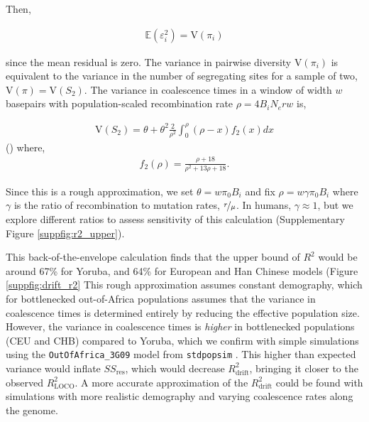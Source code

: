 \documentclass[11pt]{article}
\newcommand{\E}{\mathbb{E}}
\newcommand{\V}{\text{V}}
\begin{document}
Then, 

\begin{align}
    \E(\varepsilon_i^2) = \V(\pi_i)
\end{align}

since the mean residual is zero. The variance in pairwise diversity
$\V(\pi_i)$ is equivalent to the variance in the number of segregating sites
for a sample of two, $\V(\pi) = \V(S_2)$. The variance in coalescence times
in a window of width $w$ basepairs with population-scaled recombination rate
$\rho = 4 B_i N_e r w$ is,

\begin{align}
    \V(S_2) = \theta + \theta^2 \frac{2}{\rho^2} \int_0^\rho (\rho - x) f_2(x) dx
\end{align}
(\cite[eq. 7.20]{Wakeley2009-ua}) where,
\begin{align}
    f_2(\rho) = \frac{\rho + 18}{\rho^2 + 13 \rho + 18}.
\end{align}

Since this is a rough approximation,  we set $\theta = w \pi_0 B_i$ and fix
$\rho = w \gamma \pi_0 B_i$ where $\gamma$ is the ratio of recombination to
mutation rates, $\nicefrac{r}{\mu}$. In humans, $\gamma \approx 1$, but we
explore different ratios to assess sensitivity of this calculation
(Supplementary Figure \ref{suppfig:r2_upper}). 

This back-of-the-envelope calculation finds that the upper bound of $R^2$ would
be around 67\% for Yoruba, and 64\% for European and Han Chinese models (Figure
\ref{suppfig:drift_r2} This rough approximation assumes constant demography,
which for bottlenecked out-of-Africa populations assumes that the variance in
coalescence times is determined entirely by reducing the effective population
size. However, the variance in coalescence times is \emph{higher} in
bottlenecked populations (CEU and CHB) compared to Yoruba, which we confirm
with simple simulations using the \texttt{OutOfAfrica\_3G09} model from
\texttt{stdpopsim} \parencite{Gutenkunst2009-pg,Adrion2020-cf}. This higher
than expected variance would inflate $SS_\text{res}$, which would decrease
$R_\text{drift}^2$, bringing it closer to the observed $R_\text{LOCO}^2$. A more
accurate approximation of the $R_\text{drift}^2$ could be found with
simulations with more realistic demography and varying coalescence rates along
the genome.
\end{document}
